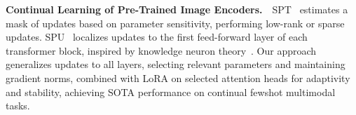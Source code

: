 \textbf{Continual Learning of Pre-Trained Image Encoders.}~~SPT~\cite{he2023sensitivity} estimates a mask of updates based on parameter sensitivity, performing low-rank or sparse updates. SPU~\cite{zhang2024overcoming} localizes updates to the first feed-forward layer of each transformer block, inspired by knowledge neuron theory~\cite{dai2021knowledge}. Our approach generalizes updates to all layers, selecting relevant parameters and maintaining gradient norms, combined with LoRA on selected attention heads for adaptivity and stability,  achieving SOTA performance on continual fewshot multimodal tasks.




